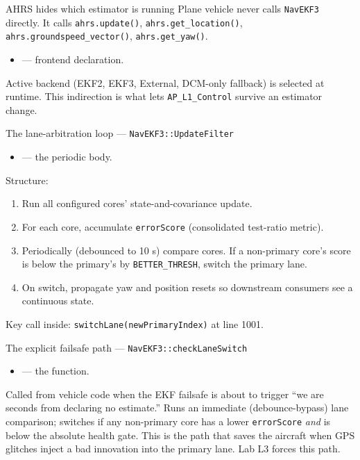 \documentclass[aspectratio=169,11pt]{beamer}
\begin{document}
\begin{frame}{AHRS hides which estimator is running}
  Plane vehicle never calls \texttt{NavEKF3} directly. It calls \texttt{ahrs.update()}, \texttt{ahrs.get\_location()}, \texttt{ahrs.groundspeed\_vector()}, \texttt{ahrs.get\_yaw()}.
  \vfill
  \begin{itemize}
    \item {} --- frontend declaration.
  \end{itemize}
  \vfill
  Active backend (EKF2, EKF3, External, DCM-only fallback) is selected at runtime. This indirection is what lets \texttt{AP\_L1\_Control} survive an estimator change.
\end{frame}

\begin{frame}{The lane-arbitration loop --- \texttt{NavEKF3::UpdateFilter}}
  \begin{itemize}
    \item {} --- the periodic body.
  \end{itemize}
  \vfill
  Structure:
  \begin{enumerate}
    \item Run all configured cores' state-and-covariance update.
    \item For each core, accumulate \texttt{errorScore} (consolidated test-ratio metric).
    \item Periodically (debounced to 10 s) compare cores. If a non-primary core's score is below the primary's by \texttt{BETTER\_THRESH}, switch the primary lane.
    \item On switch, propagate yaw and position resets so downstream consumers see a continuous state.
  \end{enumerate}
  \vfill
  Key call inside: \texttt{switchLane(newPrimaryIndex)} at line 1001.
\end{frame}

\begin{frame}{The explicit failsafe path --- \texttt{NavEKF3::checkLaneSwitch}}
  \begin{itemize}
    \item {} --- the function.
  \end{itemize}
  \vfill
  Called from vehicle code when the EKF failsafe is about to trigger ``we are seconds from declaring no estimate.''
  \vfill
  Runs an immediate (debounce-bypass) lane comparison; switches if any non-primary core has a lower \texttt{errorScore} \emph{and} is below the absolute health gate.
  \vfill
  This is the path that saves the aircraft when GPS glitches inject a bad innovation into the primary lane. Lab L3 forces this path.
\end{frame}
\end{document}
